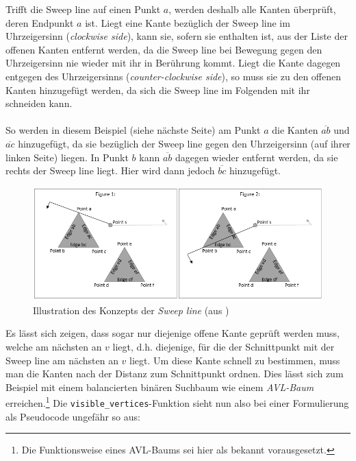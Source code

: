 \documentclass[a4paper, notitlepage, 12pt]{scrartcl}
\begin{document}
 Trifft die Sweep line auf einen Punkt $a$, werden deshalb alle Kanten überprüft, deren Endpunkt $a$ ist. Liegt eine Kante bezüglich der Sweep line im Uhrzeigersinn (\emph{clockwise side}), kann sie, sofern sie enthalten ist, aus der Liste der offenen Kanten entfernt werden, da die Sweep line bei Bewegung gegen den Uhrzeigersinn nie wieder mit ihr in Berührung kommt. Liegt die Kante dagegen entgegen des Uhrzeigersinns (\emph{counter-clockwise side}), so muss sie zu den offenen Kanten hinzugefügt werden, da sich die Sweep line im Folgenden mit ihr schneiden kann. \\ \\
 So werden in diesem Beispiel (siehe nächste Seite) am Punkt $a$ die Kanten $\overline{ab}$ und $\overline{ac}$ hinzugefügt, da sie bezüglich der Sweep line gegen den Uhrzeigersinn (auf ihrer linken Seite) liegen. In Punkt $b$ kann $\overline{ab}$ dagegen wieder entfernt werden, da sie rechts der Sweep line liegt. Hier wird dann jedoch $\overline{bc}$ hinzugefügt.
  \begin{figure}[H]
 	\centering \includegraphics[scale=0.6]{pics/lee_figure1}
 	\caption{Illustration des Konzepts der \emph{Sweep line} (aus \cite{Src:pyvistwo})}
 \end{figure}
Es lässt sich zeigen, dass sogar nur diejenige offene Kante geprüft werden muss, welche am nächsten an $v$ liegt, d.h. diejenige, für die der Schnittpunkt mit der Sweep line am nächsten an $v$ liegt. Um diese Kante schnell zu bestimmen, muss man die Kanten nach der Distanz zum Schnittpunkt ordnen. Dies lässt sich zum Beispiel mit einem balancierten binären Suchbaum wie einem \emph{AVL-Baum} erreichen.\footnote{Die Funktionsweise eines AVL-Baums sei hier als bekannt vorausgesetzt.}\cite{Src:pyvistwo} Die \texttt{visible\_vertices}-Funktion sieht nun also bei einer Formulierung als Pseudocode ungefähr so aus:
\end{document}

